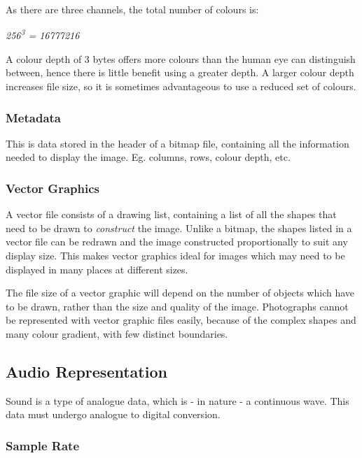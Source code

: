 \documentclass[9pt]{article}
\begin{document}
As there are three channels, the total number of colours is:

\emph{256\textsuperscript{3} = 16777216}

A colour depth of 3 bytes offers more colours than the human eye can distinguish between, hence there is little benefit using a greater depth. A larger colour depth increases file size, so it is sometimes advantageous to use a reduced set of colours.

\subsubsection{Metadata}
\label{sec:org0ea344c}

This is data stored in the header of a bitmap file, containing all the information needed to display the image. Eg. columns, rows, colour depth, etc.

\subsubsection{Vector Graphics}
\label{sec:org5150539}

A vector file consists of a drawing list, containing a list of all the shapes that need to be drawn to \emph{construct} the image. Unlike a bitmap, the shapes listed in a vector file can be redrawn and the image constructed proportionally to suit any display size. This makes vector graphics ideal for images which may need to be displayed in many places at different sizes.

The file size of a vector graphic will depend on the number of objects which have to be drawn, rather than the size and quality of the image. Photographs cannot be represented with vector graphic files easily, because of the complex shapes and many colour gradient, with few distinct boundaries.

\subsection{Audio Representation}
\label{sec:org7e868c2}

Sound is a type of analogue data, which is - in nature - a continuous wave. This data must undergo analogue to digital conversion.

\subsubsection{Sample Rate}
\label{sec:orgac5b931}
\end{document}
